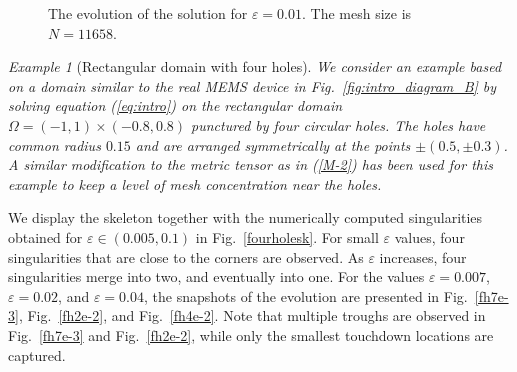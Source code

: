 \documentclass{siamart0516}
\renewcommand{\eqref}[1]{(\ref{#1})}
\newcommand{\eps}{\varepsilon}
\theoremstyle{plain}%
\theoremstyle{definition}
\theoremstyle{remark}
\newtheorem{exam}{\hspace{1mm}Example}[section]
\begin{document}
%
%

\begin{figure}[!ht]
\centering
{}\qquad
{}\qquad
{}
\qquad
{}\qquad
{}
\caption{The evolution of the solution for $\eps = 0.01$. The mesh size is $N = 11658$. \label{r2e-2}}
\end{figure}

\clearpage

\vspace{10pt}

\begin{exam}[Rectangular domain with four holes]
{\em We consider an example based on a domain similar to the real MEMS device in Fig.~\ref{fig:intro_diagram_B} by solving equation \eqref{eq:intro} on the rectangular domain $\Omega = (-1,1)\times (-0.8,0.8)$ punctured by four circular holes. The holes have common radius $0.15$ and are arranged symmetrically at the points $\pm(0.5,\pm 0.3)$.
A similar modification to the metric tensor as in \eqref{M-2} has been used for this example
to keep a level of mesh concentration near the holes.
}

\end{exam}

We display the skeleton together with the numerically computed singularities obtained for $\eps \in (0.005, 0.1)$ in Fig.~\ref{fourholesk}. For small $\eps$ values, four singularities that are close to the corners are observed. As $\eps$ increases, four singularities merge into two, and eventually into one. For the values $\eps = 0.007$, $\eps = 0.02$, and $\eps = 0.04$, the snapshots of the evolution are presented in Fig.~\ref{fh7e-3}, Fig.~\ref{fh2e-2}, and Fig.~\ref{fh4e-2}. Note that multiple troughs are observed in Fig.~\ref{fh7e-3} and Fig.~\ref{fh2e-2}, while only the smallest touchdown locations are captured.
\end{document}
